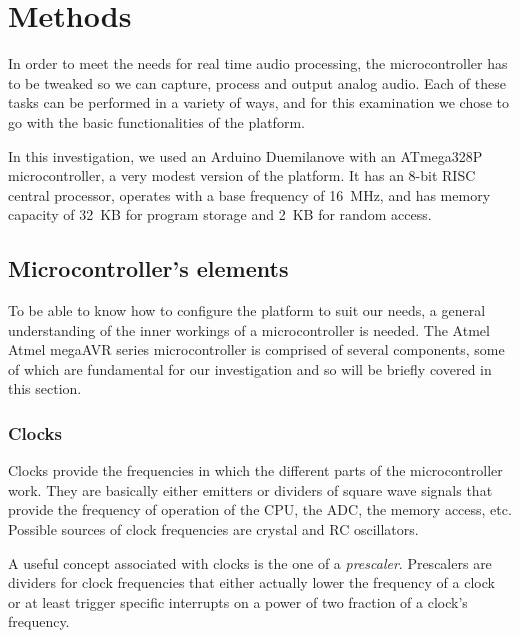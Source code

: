 
\section{Methods}
\label{sec:methods}

In order to meet the needs for real time audio processing, the microcontroller
has to be tweaked so we can capture, process and output analog audio. Each of
these tasks can be performed in a variety of ways, and for this examination we
chose to go with the basic functionalities of the platform.

In this investigation, we used an Arduino Duemilanove with an ATmega328P
microcontroller, a very modest version of the platform. It has an 8-bit RISC
central processor, operates with a base frequency of 16~MHz, and has memory
capacity of 32~KB for program storage and 2~KB for random access.

\subsection{Microcontroller's elements}

\setlength{\itemsep}{0em}

To be able to know how to configure the platform to suit our needs, a general
understanding of the inner workings of a microcontroller is needed. The Atmel
Atmel megaAVR series microcontroller is comprised of several components, some
of which are fundamental for our investigation and so will be briefly covered
in this section.

\subsubsection{Clocks}

Clocks provide the frequencies in which the different parts of the
microcontroller work. They are basically either emitters or dividers of square
wave signals that provide the frequency of operation of the CPU, the ADC,
the memory access, etc. Possible sources of clock frequencies are crystal
and RC oscillators.

A useful concept associated with clocks is the one of a \emph{prescaler}.
Prescalers are dividers for clock frequencies that either actually lower the
frequency of a clock or at least trigger specific interrupts on a power of two
fraction of a clock's frequency.

